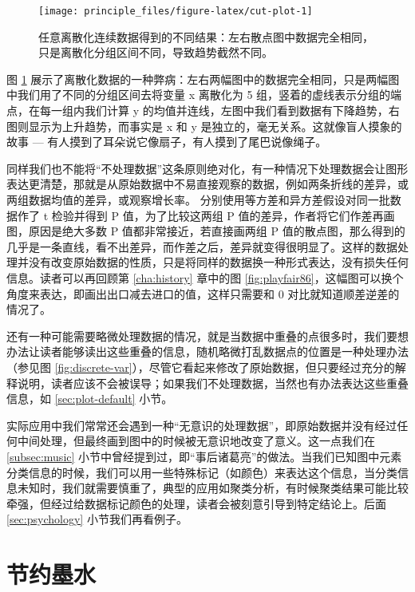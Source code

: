 \documentclass[
  b5paper,
  UTF8,twoside]{book}
\begin{document}
\begin{figure}

{\centering \texttt{[image: principle\_files/figure-latex/cut-plot-1]} 

}

\caption[ 任意离散化连续数据得到的不同结果 ]{任意离散化连续数据得到的不同结果：左右散点图中数据完全相同，只是离散化分组区间不同，导致趋势截然不同。}\label{fig:cut-plot}
\end{figure}



图 \ref{fig:cut-plot} 展示了离散化数据的一种弊病：左右两幅图中的数据完全相同，只是两幅图中我们用了不同的分组区间去将变量 x 离散化为 5 组，竖着的虚线表示分组的端点，在每一组内我们计算 y 的均值并连线，左图中我们看到数据有下降趋势，右图则显示为上升趋势，而事实是 x 和 y 是独立的，毫无关系。这就像盲人摸象的故事 --- 有人摸到了耳朵说它像扇子，有人摸到了尾巴说像绳子。

同样我们也不能将``不处理数据''这条原则绝对化，有一种情况下处理数据会让图形表达更清楚，那就是从原始数据中不易直接观察的数据，例如两条折线的差异，或两组数据均值的差异，或观察增长率。 \citet{Xie10Thesis} 分别使用等方差和异方差假设对同一批数据作了 t 检验并得到 P 值，为了比较这两组 P 值的差异，作者将它们作差再画图，原因是绝大多数 P 值都非常接近，若直接画两组 P 值的散点图，那么得到的几乎是一条直线，看不出差异，而作差之后，差异就变得很明显了。这样的数据处理并没有改变原始数据的性质，只是将同样的数据换一种形式表达，没有损失任何信息。读者可以再回顾第 \ref{cha:history} 章中的图 \ref{fig:playfair86}，这幅图可以换个角度来表达，即画出出口减去进口的值，这样只需要和 0 对比就知道顺差逆差的情况了。

还有一种可能需要略微处理数据的情况，就是当数据中重叠的点很多时，我们要想办法让读者能够读出这些重叠的信息，随机略微打乱数据点的位置是一种处理办法（参见图 \ref{fig:discrete-var}），尽管它看起来修改了原始数据，但只要经过充分的解释说明，读者应该不会被误导；如果我们不处理数据，当然也有办法表达这些重叠信息，如 \ref{sec:plot-default} 小节。

实际应用中我们常常还会遇到一种``无意识的处理数据''，即原始数据并没有经过任何中间处理，但最终画到图中的时候被无意识地改变了意义。这一点我们在 \ref{subsec:music} 小节中曾经提到过，即``事后诸葛亮''的做法。当我们已知图中元素分类信息的时候，我们可以用一些特殊标记（如颜色）来表达这个信息，当分类信息未知时，我们就需要慎重了，典型的应用如聚类分析，有时候聚类结果可能比较牵强，但经过给数据标记颜色的处理，读者会被刻意引导到特定结论上。后面 \ref{sec:psychology} 小节我们再看例子。

\hypertarget{ux8282ux7ea6ux58a8ux6c34}{%
\section{节约墨水}\label{ux8282ux7ea6ux58a8ux6c34}}
\end{document}
